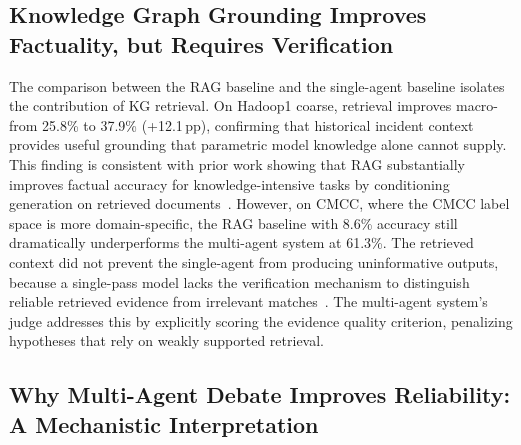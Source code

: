 \subsection{Knowledge Graph Grounding Improves Factuality, but Requires Verification}

The comparison between the RAG baseline and the single-agent baseline isolates the contribution of
KG retrieval. On Hadoop1 coarse, retrieval improves macro-\fone{} from 25.8\% to 37.9\%
(+12.1\,pp), confirming that historical incident context provides useful grounding that parametric
model knowledge alone cannot supply. This finding is consistent with prior work showing that RAG
substantially improves factual accuracy for knowledge-intensive tasks by conditioning generation on
retrieved documents~\cite{lewis2021retrievalaugmentedgenerationknowledgeintensivenlp}. However,
on CMCC, where the CMCC label space is more domain-specific, the RAG baseline with 8.6\% accuracy
still dramatically underperforms the multi-agent system at 61.3\%. The retrieved context did not
prevent the single-agent from producing uninformative outputs, because a single-pass model lacks
the verification mechanism to distinguish reliable retrieved evidence from irrelevant
matches~\cite{roy2024llmagentRCA,cui2025aetherlog}. The multi-agent system's judge addresses this
by explicitly scoring the evidence quality criterion, penalizing hypotheses that rely on weakly
supported retrieval.

\subsection{Why Multi-Agent Debate Improves Reliability: A Mechanistic Interpretation}

